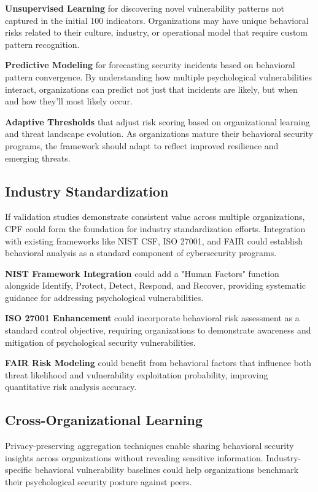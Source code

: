 \documentclass[11pt,a4paper]{article}
\begin{document}
\textbf{Unsupervised Learning} for discovering novel vulnerability patterns not captured in the initial 100 indicators. Organizations may have unique behavioral risks related to their culture, industry, or operational model that require custom pattern recognition.

\textbf{Predictive Modeling} for forecasting security incidents based on behavioral pattern convergence. By understanding how multiple psychological vulnerabilities interact, organizations can predict not just that incidents are likely, but when and how they'll most likely occur.

\textbf{Adaptive Thresholds} that adjust risk scoring based on organizational learning and threat landscape evolution. As organizations mature their behavioral security programs, the framework should adapt to reflect improved resilience and emerging threats.

\subsection{Industry Standardization}

If validation studies demonstrate consistent value across multiple organizations, CPF could form the foundation for industry standardization efforts. Integration with existing frameworks like NIST CSF, ISO 27001, and FAIR could establish behavioral analysis as a standard component of cybersecurity programs.

\textbf{NIST Framework Integration} could add a "Human Factors" function alongside Identify, Protect, Detect, Respond, and Recover, providing systematic guidance for addressing psychological vulnerabilities.

\textbf{ISO 27001 Enhancement} could incorporate behavioral risk assessment as a standard control objective, requiring organizations to demonstrate awareness and mitigation of psychological security vulnerabilities.

\textbf{FAIR Risk Modeling} could benefit from behavioral factors that influence both threat likelihood and vulnerability exploitation probability, improving quantitative risk analysis accuracy.

\subsection{Cross-Organizational Learning}

Privacy-preserving aggregation techniques enable sharing behavioral security insights across organizations without revealing sensitive information. Industry-specific behavioral vulnerability baselines could help organizations benchmark their psychological security posture against peers.
\end{document}
